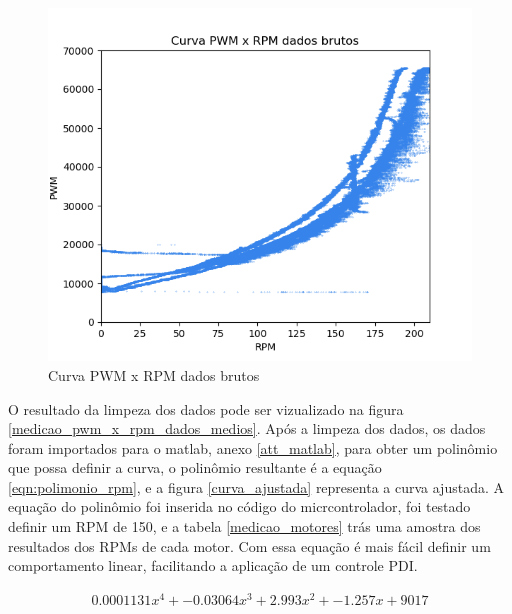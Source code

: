 \begin{figure}[htb]
	\centering
	\includegraphics{figures/curva_pwm_x_rpm_dados_brutos}
	\caption{Curva PWM x RPM dados brutos}
	\label{fig:medicao_pwm_x_rpm_dados_brutos}
\end{figure}


O resultado da limpeza dos dados pode ser vizualizado na figura \autoref{medicao_pwm_x_rpm_dados_medios}.
Após a limpeza dos dados, os dados foram importados para o matlab, anexo \autoref{att_matlab},
para obter um polinômio que possa definir a curva, o polinômio resultante é a equação \ref{eqn:polimonio_rpm}, e a figura \autoref{curva_ajustada} representa a curva ajustada.
A equação do polinômio foi inserida no código do micrcontrolador, foi testado definir um RPM de 150, e a tabela \autoref{medicao_motores} trás uma amostra dos resultados dos RPMs de cada motor.
Com essa equação é mais fácil definir um comportamento linear, facilitando a aplicação de um controle PDI.

\begin{equation}
    \begin{split}
        0.0001131x^{4} + -0.03064x^{3} + 2.993x^{2} + -1.257x + 9017
    \end{split}
    \label{eqn:polimonio_rpm}
\end{equation}

